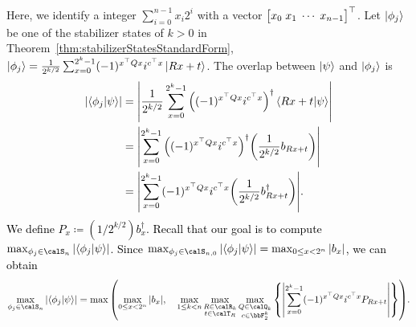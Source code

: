 \documentclass[aps,prx,onecolumn,superscriptaddress,nobibnotes,nofootinbib]{revtex4-2}
\newcommand{\black}[1]{\textcolor{black}{#1}}
\newcommand{\defeq}{\coloneqq}
\begin{document}
Here, we identify a integer $\sum_{i=0}^{n-1} x_i 2^i$ with a vector $\mqty[ x_0 \; x_1 \; \cdots \; x_{n-1} ]^\top$.
Let $\ket{\phi_j}$ be one of the stabilizer states of $k>0$ in Theorem~\ref{thm:stabilizerStatesStandardForm}, $\ket{\phi_j} = \frac{1}{2^{k/2}}\sum_{x=0}^{2^k-1} (-1)^{x^\top Q x} i^{c^\top x} \ket{Rx+t}$.
The overlap between $\ket{\psi}$ and $\ket{\phi_j}$ is
\begin{align*}
  \abs{\braket{\phi_j}{\psi}}
   & = \abs{\frac{1}{2^{k/2}} \sum_{x=0}^{2^k-1} \qty((-1)^{x^\top Q x} i^{c^\top x})^\dagger \braket{Rx+t}{\psi}}   \\
   & = \black{\abs{\sum_{x=0}^{2^k-1} \qty((-1)^{x^\top Q x} i^{c^\top x})^\dagger \qty(\frac{1}{2^{k/2}}b_{Rx+t})}} \\
   & = \black{\abs{\sum_{x=0}^{2^k-1} (-1)^{x^\top Q x} i^{c^\top x} \qty(\frac{1}{2^{k/2}}b_{Rx+t}^\dagger)}}.
\end{align*}
\black{We define $P_x \defeq (1/2^{k/2}) b_x^\dagger$.
  Recall that our goal is to compute $\max_{\phi_j \in \calS_n} \abs{\braket{\phi_j}{\psi}}$.
  Since $\max_{\phi_j \in \calS_{n,0}} \abs{\braket{\phi_j}{\psi}} = \max_{0 \leq x < 2^n} \abs{b_x}$, we can obtain
  \begin{equation}\label{eq:overlapProblemAll}
    \black{
      \max_{\phi_j \in \calS_n} \abs{\braket{\phi_j}{\psi}} =
      \max\qty(  \max_{0 \leq x < 2^n} \abs{b_x}, \quad
      \max_{1 \leq k < n}\max_{\substack{R \in \calR_k\\t \in \calT_R}}\max_{\substack{Q\in \calQ_k\\ c\in\bbF_2^k}} \qty{ \abs{\sum_{x=0}^{2^k-1} (-1)^{x^\top Q x} i^{c^\top x} P_{Rx+t}}}).
    }
  \end{equation}}
\end{document}
